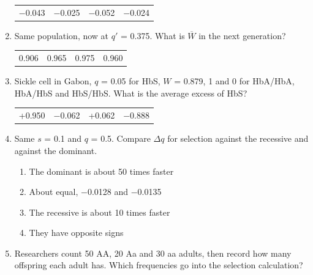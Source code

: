 \documentclass[11pt]{article}
\newcommand{\work}[1]{\par\vspace{#1}}
\begin{document}
\begin{enumerate}[label=\textbf{\arabic*.}, leftmargin=2em, itemsep=1.4em]
\begin{tabularx}{\linewidth}{@{}YYYY@{}}
\(-\)0.043 & \(-\)0.025 & \(-\)0.052 & \(-\)0.024 \\
\end{tabularx}
\work{1.6cm}
\item Same population, now at \(q'\) = 0.375. What is \(\overline{W}\) in the next generation?
\par\smallskip\noindent\begin{tabularx}{\linewidth}{@{}YYYY@{}}
0.906 & 0.965 & 0.975 & 0.960 \\
\end{tabularx}
\work{1.6cm}
\item Sickle cell in Gabon, \(q\) = 0.05 for HbS, \(W\) = 0.879, 1 and 0 for HbA/HbA, HbA/HbS and HbS/HbS. What is the average excess of HbS?
\par\smallskip\noindent\begin{tabularx}{\linewidth}{@{}YYYY@{}}
+0.950 & \(-\)0.062 & +0.062 & \(-\)0.888 \\
\end{tabularx}
\work{1.6cm}
\item Same \(s\) = 0.1 and \(q\) = 0.5. Compare \(\Delta q\) for selection against the recessive and against the dominant.
\par\smallskip
\begin{enumerate}[label={}, leftmargin=2.4em, labelwidth=0pt, itemsep=2pt, topsep=0pt]
\item \hspace*{-2.4em}The dominant is about 50 times faster
\item \hspace*{-2.4em}About equal, \(-\)0.0128 and \(-\)0.0135
\item \hspace*{-2.4em}The recessive is about 10 times faster
\item \hspace*{-2.4em}They have opposite signs
\end{enumerate}
\item Researchers count 50 AA, 20 Aa and 30 aa adults, then record how many offspring each adult has. Which frequencies go into the selection calculation?

\end{enumerate}
\end{document}
